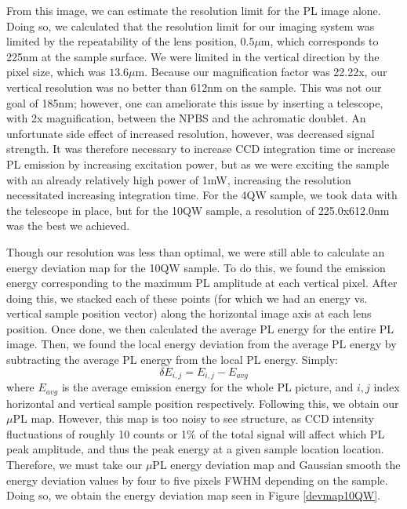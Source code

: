 \indent From this image, we can estimate the resolution limit for the PL image alone. Doing so, we calculated that the resolution limit for our imaging system was limited by the repeatability of the lens position, $0.5\mu$m, which corresponds to 225nm at the sample surface. We were limited in the vertical direction by the pixel size, which was $13.6\mu$m. Because our magnification factor was 22.22x, our vertical resolution was no better than 612nm on the sample. This was not our goal of 185nm; however, one can ameliorate this issue by inserting a telescope, with 2x magnification, between the NPBS and the achromatic doublet. An unfortunate side effect of increased resolution, however, was decreased signal strength. It was therefore necessary to increase CCD integration time or increase PL emission by increasing excitation power, but as we were exciting the sample with an already relatively high power of 1mW, increasing the resolution necessitated increasing integration time. For the 4QW sample, we took data with the telescope in place, but for the 10QW sample, a resolution of 225.0x612.0nm was the best we achieved.
 


\indent Though our resolution was less than optimal, we were still able to calculate an energy deviation map for the 10QW sample. To do this, we found the emission energy corresponding to the maximum PL amplitude at each vertical pixel. After doing this, we stacked each of these points (for which we had an energy vs. vertical sample position vector) along the horizontal image axis at each lens position. Once done, we then calculated the average PL energy for the entire PL image. Then, we found the local energy deviation from the average PL energy by subtracting the average PL energy from the local PL energy. Simply: 
\begin{equation}
\delta E_{i,j} = E_{i,j}-E_{avg}
\end{equation}
where $E_{avg}$ is the average emission energy for the whole PL picture, and $i,j$ index horizontal and vertical sample position respectively. Following this, we obtain our $\mu$PL map. However, this map is too noisy to see structure, as CCD intensity fluctuations of roughly 10 counts or 1\% of the total signal will affect which PL peak amplitude, and thus the peak energy at a given sample location location. Therefore, we must take our $\mu$PL energy deviation map and Gaussian smooth the energy deviation values by four to five pixels FWHM depending on the sample. Doing so, we obtain the energy deviation map seen in Figure \ref{devmap10QW}.

